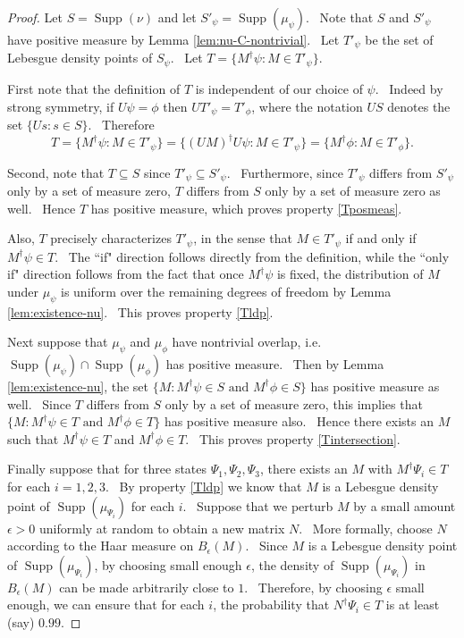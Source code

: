 \documentclass[letterpaper,12pt]{article}
\DeclareMathOperator{\supp}{Supp}
\begin{document}
\begin{proof}

Let $S=\supp(\nu)$ and let $S'_\psi = \supp(\mu_\psi)$. \ Note that $S$ and $S'_\psi$ have positive measure by Lemma \ref{lem:nu-C-nontrivial}. \ Let $T'_\psi$ be the set of Lebesgue density points of $S_\psi$. \ Let $T=\{M^\dagger \psi : M \in T'_\psi\}$.

First note that the definition of $T$ is independent of our choice of $\psi$. \ Indeed by strong symmetry, if $U\psi=\phi$ then $U T'_\psi = T'_\phi$, where the notation $U S$ denotes the set $\{Us : s\in S\}$. \ Therefore
\[
T=\{M^\dagger \psi : M \in T'_\psi\} = \{ (UM)^\dagger U \psi : M \in T'_\psi\} = \{M^\dagger \phi : M \in T'_\phi\}.
\]

Second, note that $T\subseteq S$ since $T'_\psi \subseteq S'_\psi$. \ Furthermore, since $T'_\psi$ differs from $S'_\psi$ only by a set of measure zero, $T$ differs from $S$ only by a set of measure zero as well. \ Hence $T$ has positive measure, which proves property \ref{Tposmeas}.

Also, $T$ precisely characterizes $T'_\psi$, in the sense that $M\in T'_\psi$ if and only if $M^\dagger \psi \in T$. \ The ``if" direction follows directly from the definition, while the ``only if" direction follows from the fact that once $M^\dagger \psi$ is fixed, the distribution of $M$ under $\mu_\psi$ is uniform over the remaining degrees of freedom by Lemma \ref{lem:existence-nu}. \ This proves property \ref{Tldp}.

Next suppose that $\mu_\psi$ and $\mu_\phi$ have nontrivial overlap, i.e.\ $\supp(\mu_\psi) \cap \supp(\mu_\phi)$ has positive measure. \ Then by Lemma \ref{lem:existence-nu}, the set $\{M: M^\dagger \psi \in S \text{ and } M^\dagger \phi \in S\}$ has positive measure as well. \ Since $T$ differs from $S$ only by a set of measure zero, this implies that $\{M: M^\dagger \psi \in T \text{ and } M^\dagger \phi \in T\}$ has positive measure also. \ Hence there exists an $M$ such that $M^\dagger \psi \in T$ and $M^\dagger \phi \in T$. \ This proves property \ref{Tintersection}.

Finally suppose that for three states $\Psi_1,\Psi_2,\Psi_3$, there exists an $M$ with $M^\dagger \Psi_i \in T$ for each $i=1,2,3$. \ By property \ref{Tldp} we know that $M$ is a Lebesgue density point of $\supp(\mu_{\Psi_i})$ for each $i$. \ Suppose that we perturb $M$ by a small amount $\epsilon >0$ uniformly at random to obtain a new matrix $N$. \ More formally, choose $N$ according to the Haar measure on $B_\epsilon (M)$. \ Since $M$ is a Lebesgue density point of $\supp(\mu_{\Psi_i})$, by choosing small enough $\epsilon$, the density of $\supp(\mu_{\Psi_i})$ in $B_\epsilon (M)$ can be made arbitrarily close to $1$. \ Therefore, by choosing $\epsilon$ small enough, we can ensure that for each $i$, the probability that $N^\dagger \Psi_i \in T$ is at least (say) $0.99$.


\end{proof}
\end{document}
